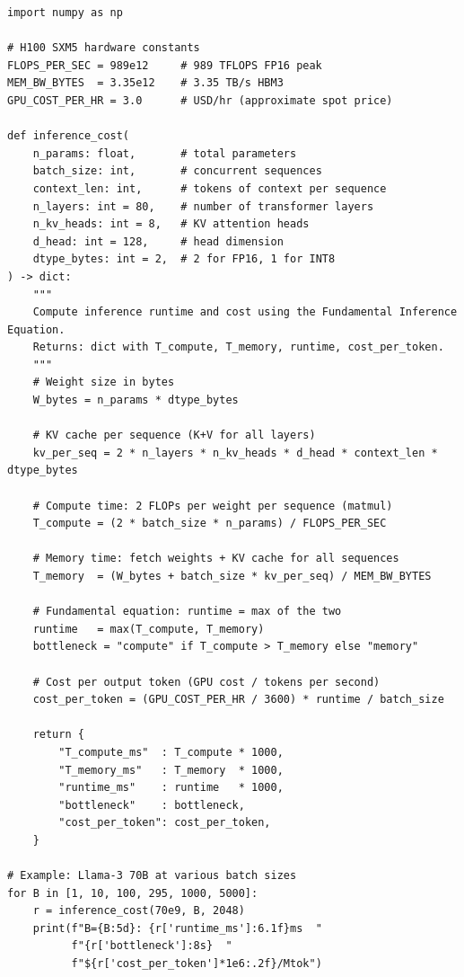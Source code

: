 \documentclass[11pt,a4paper]{article}
\begin{document}
\begin{lstlisting}[caption={Roofline cost model (Python)}, label=lst:roofline]
import numpy as np

# H100 SXM5 hardware constants
FLOPS_PER_SEC = 989e12     # 989 TFLOPS FP16 peak
MEM_BW_BYTES  = 3.35e12    # 3.35 TB/s HBM3
GPU_COST_PER_HR = 3.0      # USD/hr (approximate spot price)

def inference_cost(
    n_params: float,       # total parameters
    batch_size: int,       # concurrent sequences
    context_len: int,      # tokens of context per sequence
    n_layers: int = 80,    # number of transformer layers
    n_kv_heads: int = 8,   # KV attention heads
    d_head: int = 128,     # head dimension
    dtype_bytes: int = 2,  # 2 for FP16, 1 for INT8
) -> dict:
    """
    Compute inference runtime and cost using the Fundamental Inference Equation.
    Returns: dict with T_compute, T_memory, runtime, cost_per_token.
    """
    # Weight size in bytes
    W_bytes = n_params * dtype_bytes

    # KV cache per sequence (K+V for all layers)
    kv_per_seq = 2 * n_layers * n_kv_heads * d_head * context_len * dtype_bytes

    # Compute time: 2 FLOPs per weight per sequence (matmul)
    T_compute = (2 * batch_size * n_params) / FLOPS_PER_SEC

    # Memory time: fetch weights + KV cache for all sequences
    T_memory  = (W_bytes + batch_size * kv_per_seq) / MEM_BW_BYTES

    # Fundamental equation: runtime = max of the two
    runtime   = max(T_compute, T_memory)
    bottleneck = "compute" if T_compute > T_memory else "memory"

    # Cost per output token (GPU cost / tokens per second)
    cost_per_token = (GPU_COST_PER_HR / 3600) * runtime / batch_size

    return {
        "T_compute_ms"  : T_compute * 1000,
        "T_memory_ms"   : T_memory  * 1000,
        "runtime_ms"    : runtime   * 1000,
        "bottleneck"    : bottleneck,
        "cost_per_token": cost_per_token,
    }

# Example: Llama-3 70B at various batch sizes
for B in [1, 10, 100, 295, 1000, 5000]:
    r = inference_cost(70e9, B, 2048)
    print(f"B={B:5d}: {r['runtime_ms']:6.1f}ms  "
          f"{r['bottleneck']:8s}  "
          f"${r['cost_per_token']*1e6:.2f}/Mtok")
\end{lstlisting}
\end{document}
